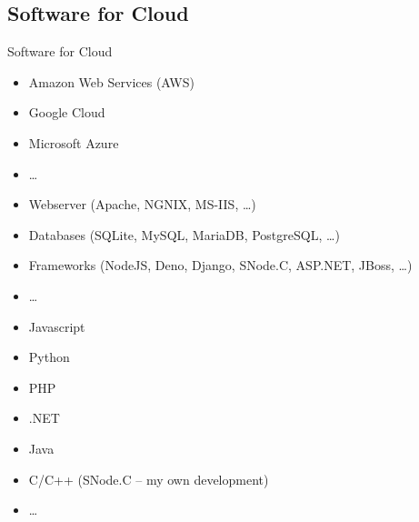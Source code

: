 ﻿\subsection{Software for Cloud}

\begin{frame}{Software for Cloud}
  \begin{description}[Languages]
    \item[Systems]
    \begin{itemize}
      \item \alert<2>{Amazon Web Services (AWS)}
      \item Google Cloud
      \item Microsoft Azure
      \item \ldots
    \end{itemize}
    \item[Tools]
    \begin{itemize}
      \item Webserver (Apache, NGNIX, MS-IIS, \ldots)
      \item Databases (SQLite, MySQL, \alert<2>{MariaDB}, PostgreSQL, \ldots)
      \item Frameworks (\alert<2>{NodeJS}, Deno, Django, \alert<2>{SNode.C}, ASP.NET, JBoss, \ldots)
      \item \ldots
    \end{itemize}
    \item[Languages]
    \begin{itemize}
      \item \alert<2>{Javascript}
      \item Python
      \item PHP
      \item .NET
      \item Java
      \item \alert<2>{C/C++ (SNode.C -- my own development)}
      \item \ldots
    \end{itemize}
  \end{description}
\end{frame}
